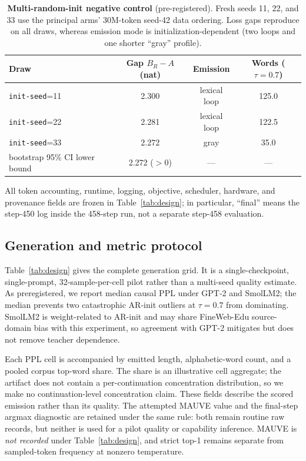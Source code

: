 \documentclass{article}
\newcommand{\armA}{AR-init}
\begin{document}
\begin{table}[!t]
  \caption{\textbf{Multi-random-init negative control} (pre-registered).
  Fresh seeds 11, 22, and 33 use the principal arms' 30M-token
  seed-42 data ordering.  Loss gaps reproduce on all draws, whereas emission
  mode is initialization-dependent (two loops and one shorter ``gray'' profile).}
  \label{tab:e1multinit}
  \centering
  \footnotesize
  \setlength{\tabcolsep}{2.5pt}
  \begin{tabular}{@{}lccc@{}}
    \toprule
    Draw & Gap $B_R-A$ (nat) & Emission & Words ($\tau{=}0.7$) \\
    \midrule
    \texttt{init-seed}=11 & 2.300 & lexical loop & 125.0 \\
    \texttt{init-seed}=22 & 2.281 & lexical loop & 122.5 \\
    \texttt{init-seed}=33 & 2.272 & gray & 35.0 \\
    \midrule
    bootstrap 95\% CI lower bound & 2.272 ($>0$) & --- & --- \\
    \bottomrule
  \end{tabular}
\end{table}

All token accounting, runtime, logging, objective, scheduler, hardware, and
provenance fields are frozen in Table~\ref{tab:design}; in particular,
``final'' means the step-450 log inside the 458-step run, not a separate
step-458 evaluation.

\subsection{Generation and metric protocol}

Table~\ref{tab:design} gives the complete generation grid.  It is a
single-checkpoint, single-prompt, 32-sample-per-cell pilot rather than a
multi-seed quality estimate.  As preregistered, we report median causal PPL
under GPT-2 and SmolLM2; the median prevents two catastrophic \armA{}
outliers at $\tau=0.7$ from dominating.  SmolLM2 is weight-related to \armA{}
and may share FineWeb-Edu source-domain bias with this experiment, so agreement
with GPT-2 mitigates but does not remove teacher dependence.

Each PPL cell is accompanied by emitted length, alphabetic-word count, and a
pooled corpus top-word share.  The share is an illustrative cell aggregate;
the artifact does not contain a per-continuation concentration distribution,
so we make no continuation-level concentration claim.  These fields describe
the scored emission rather than its quality.  The attempted MAUVE value and
the final-step argmax diagnostic are retained under the same rule: both remain
routine raw records, but neither is used for a pilot quality or capability
inference.  MAUVE is \emph{not recorded} under Table~\ref{tab:design}, and
strict top-1 remains separate from sampled-token frequency at nonzero temperature.
\end{document}
